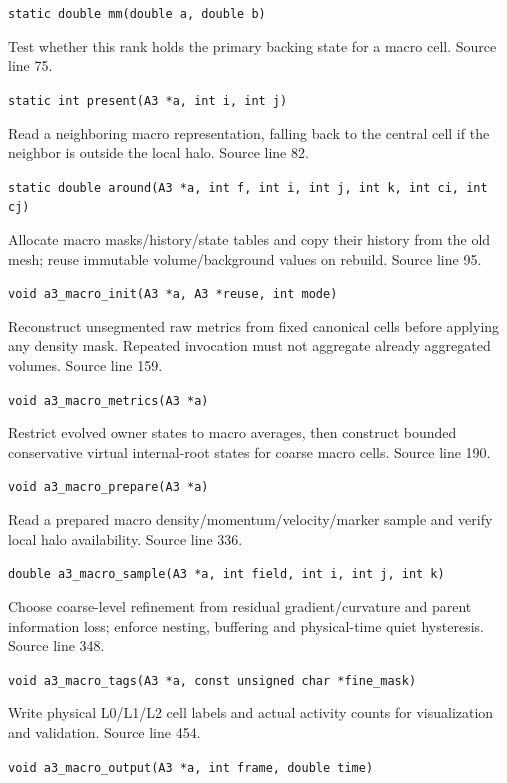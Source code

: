 \begin{description}[style=nextline,leftmargin=0pt,labelindent=0pt,labelwidth=0pt,labelsep=0pt]
{\small\nolinkurl{static double mm(double a, double b)}}
\item[\texttt{present}] Test whether this rank holds the primary backing state for a macro cell. Source line 75.\par
{\small\nolinkurl{static int present(A3 *a, int i, int j)}}
\item[\texttt{around}] Read a neighboring macro representation, falling back to the central cell if the neighbor is outside the local halo. Source line 82.\par
{\small\nolinkurl{static double around(A3 *a, int f, int i, int j, int k, int ci, int cj)}}
\item[\texttt{a3\_macro\_init}] Allocate macro masks/history/state tables and copy their history from the old mesh; reuse immutable volume/background values on rebuild. Source line 95.\par
{\small\nolinkurl{void a3_macro_init(A3 *a, A3 *reuse, int mode)}}
\item[\texttt{a3\_macro\_metrics}] Reconstruct unsegmented raw metrics from fixed canonical cells before applying any density mask. Repeated invocation must not aggregate already aggregated volumes. Source line 159.\par
{\small\nolinkurl{void a3_macro_metrics(A3 *a)}}
\item[\texttt{a3\_macro\_prepare}] Restrict evolved owner states to macro averages, then construct bounded conservative virtual internal-root states for coarse macro cells. Source line 190.\par
{\small\nolinkurl{void a3_macro_prepare(A3 *a)}}
\item[\texttt{a3\_macro\_sample}] Read a prepared macro density/momentum/velocity/marker sample and verify local halo availability. Source line 336.\par
{\small\nolinkurl{double a3_macro_sample(A3 *a, int field, int i, int j, int k)}}
\item[\texttt{a3\_macro\_tags}] Choose coarse-level refinement from residual gradient/curvature and parent information loss; enforce nesting, buffering and physical-time quiet hysteresis. Source line 348.\par
{\small\nolinkurl{void a3_macro_tags(A3 *a, const unsigned char *fine_mask)}}
\item[\texttt{a3\_macro\_output}] Write physical L0/L1/L2 cell labels and actual activity counts for visualization and validation. Source line 454.\par
{\small\nolinkurl{void a3_macro_output(A3 *a, int frame, double time)}}

\end{description}
